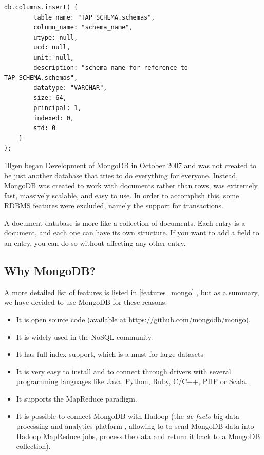 \begin{lstlisting}[float,label=lst:docinsert,caption=MongoDB column insertion example in JSON]
db.columns.insert( {
		table_name: "TAP_SCHEMA.schemas",
		column_name: "schema_name",
		utype: null,
		ucd: null,
		unit: null,
		description: "schema name for reference to TAP_SCHEMA.schemas",
		datatype: "VARCHAR",
		size: 64,
		principal: 1,
		indexed: 0,
		std: 0
	}
);
\end{lstlisting} 


10gen began Development of MongoDB in October 2007 and was not created to be just another database that tries to do everything for everyone. Instead, MongoDB was created to work with documents rather than rows, was extremely fast, massively scalable, and easy to use. In order to accomplish this, some
RDBMS
features were excluded, namely
the
support for transactions.

A document database is more like a collection of documents. Each entry is a document, and each one can have its own structure. If you want to add a field to an entry, you can do so without affecting any other entry.



\subsection{Why MongoDB?}

A more detailed list of features is listed in \ref{features_mongo} , but as a summary, we have decided to use MongoDB for these reasons:

\begin{itemize}
\item It is open source code (available at \url{https://github.com/mongodb/mongo}).
\item It is widely used in the NoSQL community.
\item It has full index %
support, which is a must for large datasets
\item It is very
easy to install and to connect through drivers with several programming languages like Java, Python, Ruby, C/C++, PHP or Scala.
\item It supports
the
MapReduce paradigm.
\item It is possible to connect MongoDB with Hadoop (the \emph{de facto} big data processing and analytics platform ,
allowing to to send MongoDB data into Hadoop MapReduce jobs, process the data and return it back to a MongoDB collection).
\end{itemize}

